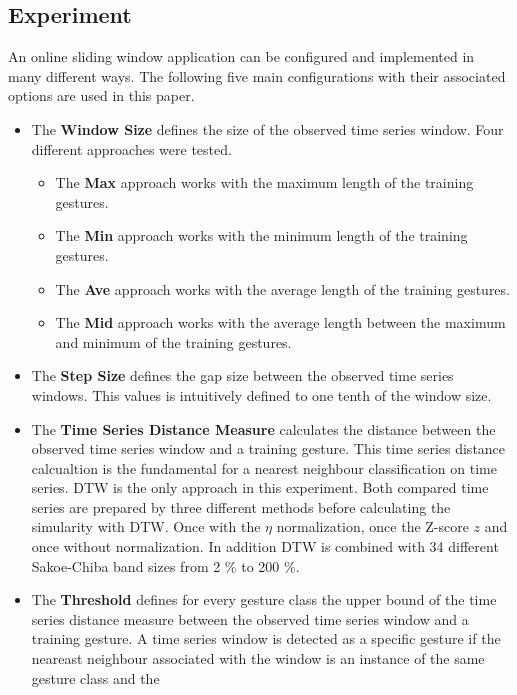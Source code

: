 \subsection{Experiment} \label{experiment}

An online sliding window application can be configured and implemented in many different ways. The following five main
configurations with their associated options are used in this paper.

\begin{itemize}
    \item The \textbf{Window Size} defines the size of the observed time series window. Four different approaches were
        tested.
        \begin{itemize}
            \item The \textbf{Max} approach works with the maximum length of the training gestures.
            \item The \textbf{Min} approach works with the minimum length of the training gestures.
            \item The \textbf{Ave} approach works with the average length of the training gestures.
            \item The \textbf{Mid} approach works with the average length between the maximum and minimum of the
                training gestures.
        \end{itemize}
    \item The \textbf{Step Size} defines the gap size between the observed time series windows. This values is
        intuitively defined to one tenth of the window size.
    \item The \textbf{Time Series Distance Measure} calculates the distance between the observed time series window and
        a training gesture. This time series distance calcualtion is the fundamental for a nearest neighbour
        classification on time series. DTW is the only approach in this experiment. Both compared time series are
        prepared by three different methods before calculating the simularity with DTW. Once with the $\eta$
        normalization, once the Z-score $z$ and once without normalization. In addition DTW is combined with
        34 different Sakoe-Chiba band sizes from 2 \% to 200 \%.
    \item The \textbf{Threshold} defines for every gesture class the upper bound of the time series distance measure
        between the observed time series window and a training gesture. A time series window is detected as a specific
        gesture if the neareast neighbour associated with the window is an instance of the same gesture class and the

\end{itemize}
